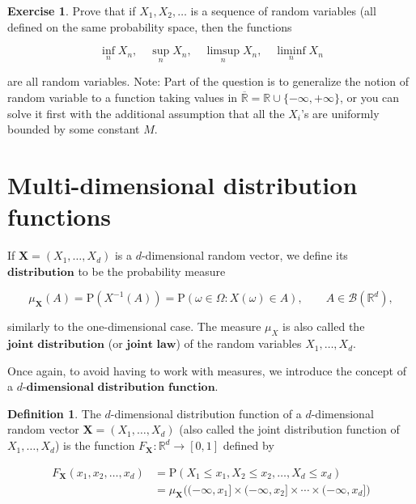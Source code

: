 \documentclass[11pt]{report}
\providecommand{\cal}{\mathcal}
\newcommand{\R}{\mathbb{R}}
\theoremstyle{plain}
\theoremstyle{definition}
\newtheorem{defn}[thm]{Definition}
\newtheorem{xexercise}[thm]{Exercise}
\begin{document}
\begin{xexercise}
Prove that if $X_1, X_2, \ldots$ is a sequence of
random variables (all defined on the same probability
space, then the functions

\[
\inf_n X_n, \quad \sup_n X_n, \quad \limsup_n X_n, \quad \liminf_n X_n
\]

are all random variables. Note: Part of the question
is to generalize the notion of random variable to a
function taking values in
$\overline{\mathbb{R}} = \R \cup \{-\infty, +\infty
\}$,
or you can solve it first with the additional
assumption that all the $X_i$'s are uniformly bounded
by some constant $M$.
\end{xexercise}

\section{Multi-dimensional distribution functions}
If $\mathbf{X}=(X_1,\ldots,X_d)$ is a $d$-dimensional
random vector, we define its $\textbf{distribution}$
to be the probability measure

\[
\mu_{\mathbf{X}}(A) = \mathrm{P}(X^{-1}(A)) = \mathrm{P}(\omega \in \Omega : X(\omega) \in A),
\qquad A \in {\cal B}(\R^d),
\]

similarly to the one-dimensional case. The measure
$\mu_X$ is also called the
$\textbf{joint distribution}$ (or
$\textbf{joint law}$) of the random variables
$X_1,\ldots,X_d$.

Once again, to avoid having to work with measures, we
introduce the concept of a $\textbf{$d
$-dimensional distribution function}$.

\begin{defn}
The $d$-dimensional distribution function of a
$d$-dimensional random vector
$\mathbf{X}=(X_1,\ldots,X_d)$ (also called the joint
distribution function of $X_1,\ldots,X_d$) is the
function $F_{\mathbf{X}}:\R^d\to[0,1]$ defined by

\begin{align*}
F_{\mathbf{X}}(x_1,x_2,\ldots,x_d)
&= \mathrm{P}( X_1 \le x_1, X_2 \le x_2, \ldots, X_d \le x_d) \\
&= \mu_{\mathbf{X}}\Big( (-\infty,x_1] \times (-\infty,x_2] \times \cdots \times (-\infty,x_d] \Big)
\end{align*}

\end{defn}
\end{document}
